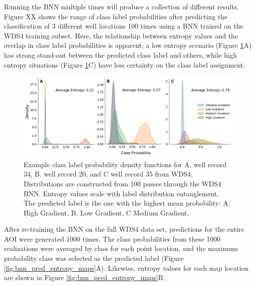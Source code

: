 Running the BNN multiple times will produce a collection of different results. Figure XX shows the range of class label probabilities after predicting the classification of 3 different well locations 100 times using a BNN trained on the WDS4 training subset. Here, the relationship between entropy values and the overlap in class label probabilities is apparent; a low entropy scenario (Figure \ref{fig:bnn_class_pdfs}A) has strong stand-out between the predicted class label and others, while high entropy situations (Figure \ref{fig:bnn_class_pdfs}C) have less certainty on the class label assignment.

\begin{figure}[!htp]
\centering
\includegraphics[width=\textwidth]{templates/images/Figure-BNN_100trials_WDS4.png}
\caption[Bayesian neural network class pdfs]{Example class label probability density functions for A. well record 34, B. well record 20, and C well record 35 from WDS4. Distributions are constructed from 100 passes through the WDS4 BNN. Entropy values scale with label distribution entanglement. The predicted label is the one with the highest mean probability: A. High Gradient, B. Low Gradient, C Medium Gradient.}
\label{fig:bnn_class_pdfs}
\end{figure}

After re-training the BNN on the full WDS4 data set, predictions for the entire AOI were generated 1000 times. The class probabilities from these 1000 realizations were averaged by class for each point location, and the maximum probability class was selected as the predicted label (Figure \ref{fig:bnn_pred_entropy_maps}A). Likewise, entropy values for each map location are shown in Figure \ref{fig:bnn_pred_entropy_maps}B. 

